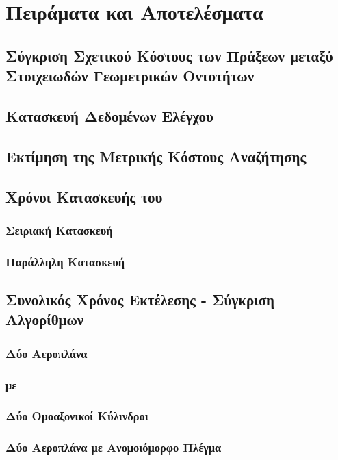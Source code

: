 \chapter{Πειράματα και Αποτελέσματα}
\label{ch:experiments}

\section{Σύγκριση Σχετικού Κόστους των Πράξεων μεταξύ Στοιχειωδών Γεωμετρικών Οντοτήτων}
\label{sec:geom_tests_cost}
\section{Κατασκευή Δεδομένων Ελέγχου}

\section{Εκτίμηση της Μετρικής Κόστους Αναζήτησης}

\section{Χρόνοι Κατασκευής του }
\subsection{Σειριακή Κατασκευή}
\subsection{Παράλληλη Κατασκευή}

\section{Συνολικός Χρόνος Εκτέλεσης - Σύγκριση Αλγορίθμων}
\subsection{Δύο Αεροπλάνα}
\subsection{ με }
\subsection{Δύο Ομοαξονικοί Κύλινδροι}
\subsection{Δύο Αεροπλάνα με Ανομοιόμορφο Πλέγμα}